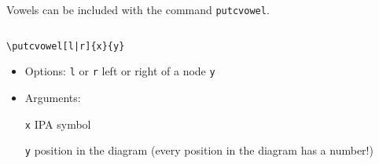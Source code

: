 
\begin{frame}[fragile]

Vowels can be included with the command \lstinline|putcvowel|.

\begin{columns}

\begin{column}{.65\textwidth}

\begin{lstlisting}
\putcvowel[l|r]{x}{y}
\end{lstlisting}

\begin{itemize}
\item Options: \lstinline|l| or \lstinline|r| \ras left or right of a node \lstinline|y|

\item Arguments: 

\lstinline|x| \ras IPA symbol

\lstinline|y| \ras position in the diagram (every position in the diagram has a number!)

\end{itemize}


\end{column}
\begin{column}{.35\textwidth}


\begin{vowel}
\end{vowel}


\end{column}
\end{columns}
\end{frame}
